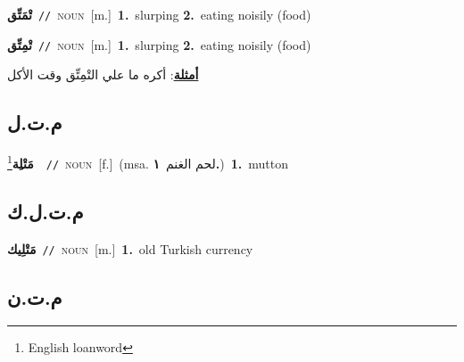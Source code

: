 \documentclass[10pt,a4paper,twoside]{article} %
\begin{document}
\begin{multicols}{2}
{{{{{{\setlength\topsep{0pt}\textbf{\foreignlanguage{arabic}{تْمَتِّق}}\ {\color{gray}\texttt{//}\color{black}}\ \textsc{noun}\ [m.]\ \textbf{1.}~slurping  \textbf{2.}~eating noisily (food)\ 

{\setlength\topsep{0pt}\textbf{\foreignlanguage{arabic}{تْمِتِّق}}\ {\color{gray}\texttt{//}\color{black}}\ \textsc{noun}\ [m.]\ \textbf{1.}~slurping  \textbf{2.}~eating noisily (food)\  \begin{flushright}\color{gray}\foreignlanguage{arabic}{\textbf{\underline{\foreignlanguage{arabic}{أمثلة}}}: أكره ما علي التْمِتِّق وقت الأكل}\end{flushright}\color{black}} \vspace{2mm}

\vspace{-3mm}
\subsection*{\color{blue}\foreignlanguage{arabic}{م.ت.ل}\color{blue}{}} 

{\setlength\topsep{0pt}\textbf{\foreignlanguage{arabic}{مَتْلِة}}\footnote{English loanword}\ \ {\color{gray}\texttt{//}\color{black}}\ \textsc{noun}\ [f.]\ \color{gray}(msa. \foreignlanguage{arabic}{لحم الغنم}~\foreignlanguage{arabic}{\textbf{١.}})\color{black}\ \textbf{1.}~mutton\ 

\vspace{-3mm}
\subsection*{\color{blue}\foreignlanguage{arabic}{م.ت.ل.ك}\color{blue}{}} 

{\setlength\topsep{0pt}\textbf{\foreignlanguage{arabic}{مَتْلِيك}}\ {\color{gray}\texttt{//}\color{black}}\ \textsc{noun}\ [m.]\ \textbf{1.}~old Turkish currency\ 

\vspace{-3mm}
\subsection*{\color{blue}\foreignlanguage{arabic}{م.ت.ن}\color{blue}{}} 

}}}}}}}}
\end{multicols}
\end{document}
